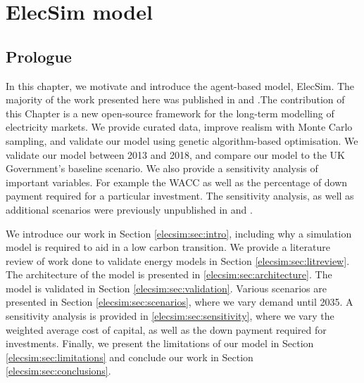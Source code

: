 \chapter{ElecSim model}
\label{chapter:elecsim}

\ifpdf
\graphicspath{{Chapter3/Figs/Raster/}{Chapter3/Figs/PDF/}{Chapter3/Figs/}}
\else
\graphicspath{{Chapter3/Figs/Vector/}{Chapter3/Figs/}}
\fi

\section*{Prologue}

In this chapter, we motivate and introduce the agent-based model, ElecSim. The majority of the work presented here was published in \cite{Kell} and \cite{Kell2020}.The contribution of this Chapter is a new open-source framework for the long-term modelling of electricity markets. We provide curated data, improve realism with Monte Carlo sampling, and validate our model using genetic algorithm-based optimisation. We validate our model between 2013 and 2018, and compare our model to the UK Government's baseline scenario. We also provide a sensitivity analysis of important variables. For example the \acrfull{WACC} as well as the percentage of down payment required for a particular investment. The sensitivity analysis, as well as additional scenarios were previously unpublished in \cite{Kell} and \cite{Kell2020}.

We introduce our work in Section \ref{elecsim:sec:intro}, including why a simulation model is required to aid in a low carbon transition. We provide a literature review of work done to validate energy models in Section \ref{elecsim:sec:litreview}. The architecture of the model is presented in \ref{elecsim:sec:architecture}. The model is validated in Section \ref{elecsim:sec:validation}. Various scenarios are presented in Section \ref{elecsim:sec:scenarios}, where we vary demand until 2035. A sensitivity analysis is provided in \ref{elecsim:sec:sensitivity}, where we vary the weighted average cost of capital, as well as the down payment required for investments. Finally, we present the limitations of our model in Section \ref{elecsim:sec:limitations} and conclude our work in Section \ref{elecsim:sec:conclusions}.




